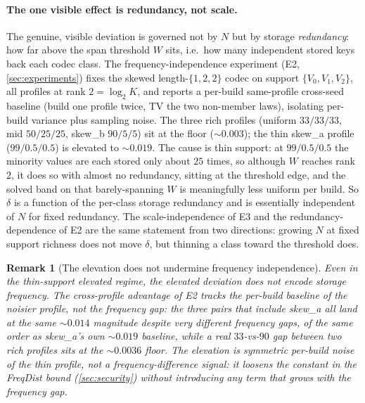\documentclass[acmsmall,review]{acmart}
\newtheorem{remark}{Remark}
\newcommand{\W}{W}                          %
\begin{document}
\paragraph{The one visible effect is redundancy, not scale.}
The genuine, visible deviation is governed not by $N$ but by storage
\emph{redundancy}: how far above the span threshold $\W$ sits, i.e.\ how many independent
stored keys back each codec class. The frequency-independence experiment (E2,
\cref{sec:experiments}) fixes the skewed length-$\{1,2,2\}$ codec on support
$\{V_0, V_1, V_2\}$, all profiles at rank $2 = \log_2 K$, and reports a per-build
same-profile cross-seed baseline (build one profile twice, TV the two non-member laws),
isolating per-build variance plus sampling noise. The three rich profiles (uniform
$33/33/33$, mid $50/25/25$, skew\_b $90/5/5$) sit at the floor ($\sim 0.003$); the thin
skew\_a profile ($99/0.5/0.5$) is elevated to $\sim 0.019$. The cause is thin support:
at $99/0.5/0.5$ the minority values are each stored only about $25$ times, so although
$\W$ reaches rank $2$, it does so with almost no redundancy, sitting at the threshold
edge, and the solved band on that barely-spanning $\W$ is meaningfully less uniform per
build. So $\delta$ is a function of the per-class storage redundancy and is essentially
independent of $N$ for fixed redundancy. The scale-independence of E3 and the
redundancy-dependence of E2 are the same statement from two directions: growing $N$ at
fixed support richness does not move $\delta$, but thinning a class toward the threshold
does.

\begin{remark}[The elevation does not undermine frequency independence]
\label{rem:elevation}
Even in the thin-support elevated regime, the elevated deviation does \emph{not} encode
storage frequency. The cross-profile advantage of E2 tracks the per-build baseline of
the noisier profile, not the frequency gap: the three pairs that include skew\_a all land
at the same $\sim 0.014$ magnitude despite very different frequency gaps, of the same
order as skew\_a's own $\sim 0.019$ baseline, while a real $33$-vs-$90$ gap between two
\emph{rich} profiles sits at the $\sim 0.0036$ floor. The elevation is symmetric
per-build noise of the thin profile, not a frequency-difference signal: it loosens the
constant in the FreqDist bound (\cref{sec:security}) without introducing any term that
grows with the frequency gap.
\end{remark}
\end{document}
